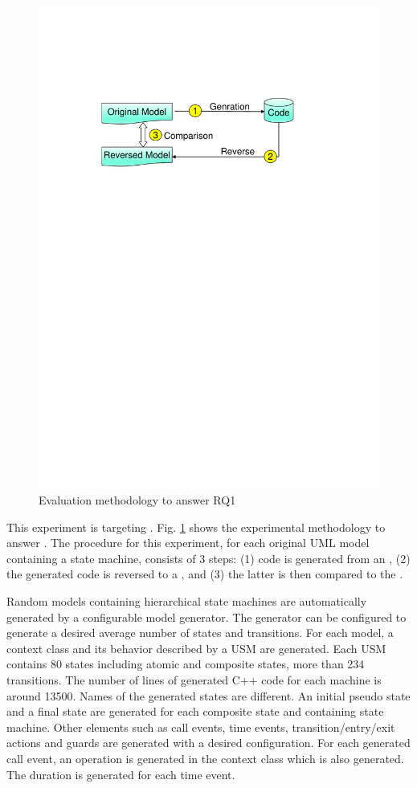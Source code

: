 \begin{figure}
	\centering
	\includegraphics[clip, trim=3.3cm 19.8cm 5.2cm 5.6cm, width=0.6\columnwidth]{figures/EvaluationStrategyBoth}
	\caption{Evaluation methodology to answer RQ1} 
	\label{fig:EvaluationStrategyBoth}
\end{figure}

This experiment is targeting . 
Fig. \ref{fig:EvaluationStrategyBoth} shows the experimental methodology to answer . 
The procedure for this experiment, for each original UML model containing a state machine, consists of 3 steps: (1) code is generated from an , (2) the generated code is reversed to a , and (3) the latter is then compared to the .%

Random models containing hierarchical state machines are automatically generated by a configurable model generator. 
The generator can be configured to generate a desired average number of states and transitions. 
For each model, a context class and its behavior described by a USM are generated. Each USM contains 80 states including atomic and composite states, more than 234 transitions. The number of lines of generated C++ code for each machine is around 13500. Names of the generated states are different. An initial pseudo state and a final state are generated for each composite state and containing state machine. Other elements such as call events, time events, transition/entry/exit actions and guards are generated with a desired configuration. For each generated call event, an operation is generated in the context class which is also generated. The duration is generated for each time event. 

